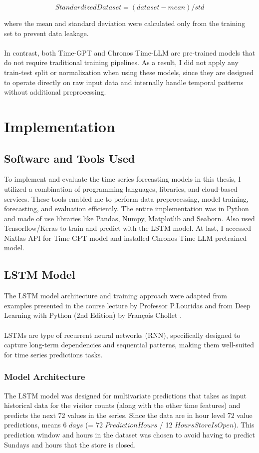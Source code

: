 \documentclass{article}
\begin{document}
\begin{equation}
    Standardized Dataset = (dataset - mean) / std
\end{equation}

where the mean and standard deviation were calculated only from the training set to prevent data leakage.\\
\\
In contrast, both Time-GPT and Chronos Time-LLM are pre-trained models that do not require traditional training pipelines. As a result, I did not apply any train-test split or normalization when using these models, since they are designed to operate directly on raw input data and internally handle temporal patterns without additional preprocessing.

\newpage
\section{Implementation}
\subsection{Software and Tools Used}

To implement and evaluate the time series forecasting models in this thesis, I utilized a combination of programming languages, libraries, and cloud-based services. These tools enabled me to perform data preprocessing, model training, forecasting, and evaluation efficiently.
The entire implementation was in Python and made of use libraries like Pandas, Numpy, Matplotlib and Seaborn. Also used Tensorflow/Keras to train and predict with the LSTM model. At last, I accessed Nixtlas API for Time-GPT model and installed Chronos Time-LLM pretrained model.


\subsection{LSTM Model}
The LSTM model architecture and training approach were adapted from examples presented in the course lecture by Professor P.Louridas and from Deep Learning with Python (2nd Edition) by François Chollet \cite{Francois}. \\
\\
LSTMs are type of recurrent neural networks (RNN), specifically designed to capture long-term dependencies and sequential patterns, making them well-suited for time series predictions tasks.

\subsubsection{Model Architecture}
The LSTM model was designed for multivariate predictions that takes as input historical data for the visitor counts (along with the other time features) and predicts the next 72 values in the series. Since the data are in hour level 72 value predictions, means 6 $days$ (= 72 $PredictionHours$ / 12 $HoursStoreIsOpen$). This prediction window and hours in the dataset was chosen to avoid having to predict Sundays and hours that the store is closed.
\end{document}
